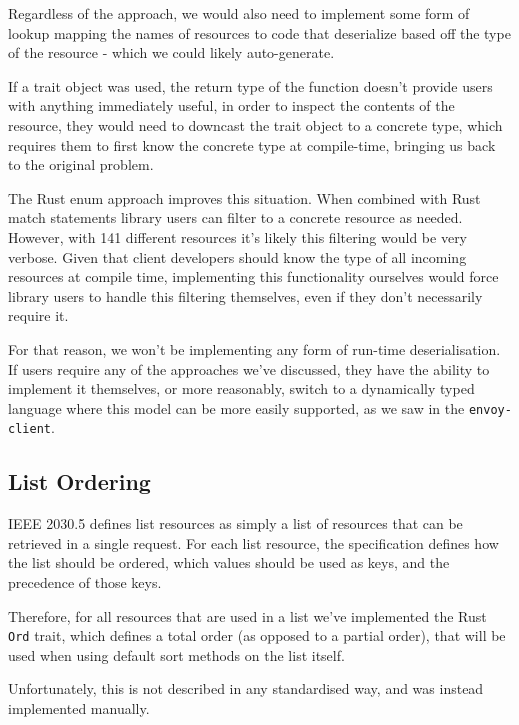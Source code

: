 Regardless of the approach, we would also need to implement some form of lookup mapping the names of resources to code that deserialize based off the type of the resource - which we could likely auto-generate.

If a trait object was used, the return type of the function doesn't provide users with anything immediately useful, in order to inspect the contents of the resource, they would need to downcast the trait object to a concrete type, which requires them to first know the concrete type at compile-time, bringing us back to the original problem.

The Rust enum approach improves this situation. When combined with Rust match statements library users can filter to a concrete resource as needed. However, with 141 different resources it's likely this filtering would be very verbose. Given that client developers should know the type of all incoming resources at compile time, implementing this functionality ourselves would force library users to handle this filtering themselves, even if they don't necessarily require it.

For that reason, we won't be implementing any form of run-time deserialisation. If users require any of the approaches we've discussed, they have the ability to implement it themselves, or more reasonably, switch to a dynamically typed language where this model can be more easily supported, as we saw in the \texttt{envoy-client}.

\subsection{List Ordering}
IEEE 2030.5 defines list resources as simply a list of resources that can be retrieved in a single request. For each list resource, the specification defines how the list should be ordered, which values should be used as keys, and the precedence of those keys. \cite{IEEE2030.5}

Therefore, for all resources that are used in a list we've implemented the Rust \texttt{Ord} trait, which defines a total order (as opposed to a partial order), that will be used when using default sort methods on the list itself.

Unfortunately, this is not described in any standardised way, and was instead implemented manually.

